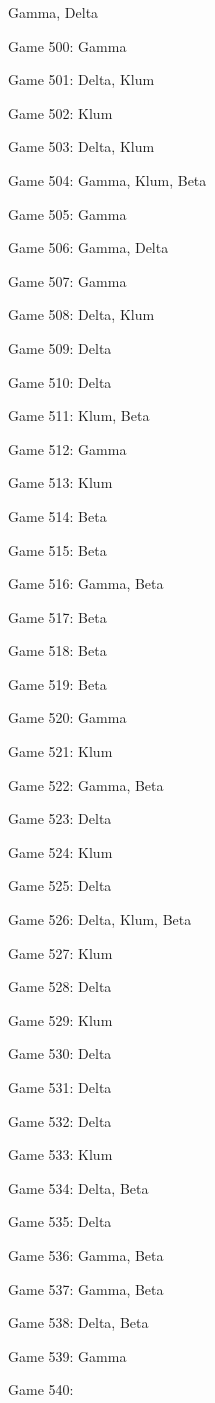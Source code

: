 \documentclass{article}
\begin{document}
\begin{multicols}{3}
\begin{compactitem}
Gamma, Delta
\item Game 500:
Gamma
\item Game 501:
Delta, Klum
\item Game 502:
Klum
\item Game 503:
Delta, Klum
\item Game 504:
Gamma, Klum, Beta
\item Game 505:
Gamma
\item Game 506:
Gamma, Delta
\item Game 507:
Gamma
\item Game 508:
Delta, Klum
\item Game 509:
Delta
\item Game 510:
Delta
\item Game 511:
Klum, Beta
\item Game 512:
Gamma
\item Game 513:
Klum
\item Game 514:
Beta
\item Game 515:
Beta
\item Game 516:
Gamma, Beta
\item Game 517:
Beta
\item Game 518:
Beta
\item Game 519:
Beta
\item Game 520:
Gamma
\item Game 521:
Klum
\item Game 522:
Gamma, Beta
\item Game 523:
Delta
\item Game 524:
Klum
\item Game 525:
Delta
\item Game 526:
Delta, Klum, Beta
\item Game 527:
Klum
\item Game 528:
Delta
\item Game 529:
Klum
\item Game 530:
Delta
\item Game 531:
Delta
\item Game 532:
Delta
\item Game 533:
Klum
\item Game 534:
Delta, Beta
\item Game 535:
Delta
\item Game 536:
Gamma, Beta
\item Game 537:
Gamma, Beta
\item Game 538:
Delta, Beta
\item Game 539:
Gamma
\item Game 540:

\end{compactitem}
\end{multicols}
\end{document}
